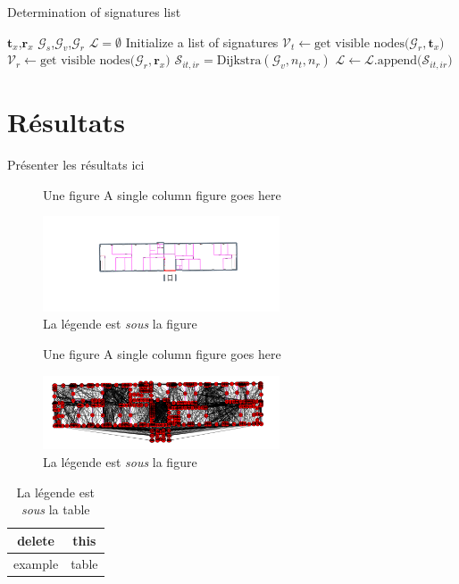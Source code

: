 \documentclass[twocolumn,a4paper]{IEEEtranfr}
\newcommand{\mc}[1]{\mathcal{#1}}
\begin{document}
\begin{algorithm}                      %
\label{alg1}                           %
\caption{Determination of signatures list}
\begin{algorithmic}                    %
\REQUIRE $\mathbf{t}_x$,$\mathbf{r}_x$
\REQUIRE $\mc{G}_s$,$\mc{G}_v$,$\mc{G}_r$
\STATE $\mathcal{L} = \emptyset $ Initialize a list of signatures
\STATE $\mathcal{V}_t \leftarrow \textrm{get visible nodes(}\mc{G}_r,\mathbf{t}_x\textrm{)}$
\STATE $\mathcal{V}_r \leftarrow \textrm{get visible nodes(}\mc{G}_r,\mathbf{r}_x\textrm{)}$
\STATE $\mc{S}_{it,ir}  = \textrm{Dijkstra}(\mc{G}_v,n_t,n_r)$
\STATE $\mathcal{L}\leftarrow \mathcal{L}.\textrm{append(}\mc{S}_{it,ir}\textrm{)}$
\ENDFOR
\ENDFOR
\end{algorithmic}
\end{algorithm}
\section{Résultats}
Présenter les résultats ici 
%


\begin{figure}[htbp]
\begin{centering}
\textsf{Une figure A single column figure goes here}
\par
\includegraphics[width=7cm]{Gs2.pdf}
\caption{La légende est \emph{sous} la figure}
\end{centering}
\end{figure}
%






\begin{figure}[htbp]
\begin{centering}
\textsf{Une figure A single column figure goes here}
\par\end{centering}
\includegraphics[width=7cm]{Gv.png}
\caption{La légende est \emph{sous} la figure}
\end{figure}
\begin{table}[htbp]
\caption{La légende  est \emph{sous} la table}


\centering{}
\begin{tabular}{|c|c|}
\hline 
delete & this\tabularnewline
\hline
\hline 
example & table\tabularnewline
\hline
\end{tabular}
\end{table}
\end{document}
